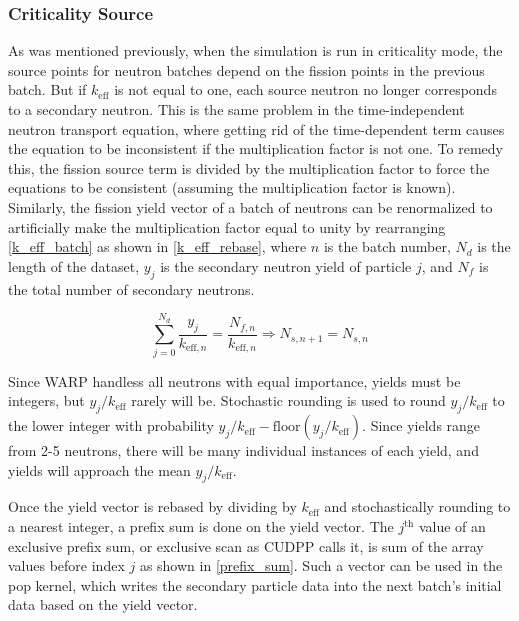 
\subsubsection{Criticality Source}


As was mentioned previously, when the simulation is run in criticality mode, the source points for neutron batches depend on the fission points in the previous batch.  But if $k_\mathrm{eff}$ is not equal to one, each source neutron no longer corresponds to a secondary neutron.  This is the same problem in the time-independent neutron transport equation, where getting rid of the time-dependent term causes the equation to be inconsistent if the multiplication factor is not one.  To remedy this, the fission source term is divided by the multiplication factor to force the equations to be consistent (assuming the multiplication factor is known).  Similarly, the fission yield vector of a batch of neutrons can be renormalized to artificially make the multiplication factor equal to unity by rearranging \eqref{k_eff_batch} as shown in \eqref{k_eff_rebase}, where $n$ is the batch number, $N_d$ is the length of the dataset, $y_j$ is the secondary neutron yield of particle $j$, and $N_f$ is the total number of secondary neutrons.%

\begin{equation}
\label{k_eff_rebase}
\sum_{j=0}^{N_d}  \frac{y_j }{k_{\mathrm{eff},n}} = \frac{N_{f,n}}{k_{\mathrm{eff},n}} \Rightarrow N_{s,n+1} = N_{s,n}
\end{equation}

Since WARP handless all neutrons with equal importance, yields must be integers, but $y_j/k_\mathrm{eff}$ rarely will be.  Stochastic rounding is used to round $y_j/k_\mathrm{eff}$ to the lower integer with probability $y_j/k_\mathrm{eff} - \mathrm{floor}(y_j/k_\mathrm{eff})$.  Since yields range from 2-5 neutrons, there will be many individual instances of each yield, and yields will approach the mean $y_j/k_\mathrm{eff}$.

Once the yield vector is rebased by dividing by $k_\mathrm{eff}$ and stochastically rounding to a nearest integer, a prefix sum is done on the yield vector.  The $j^{\text{th}}$ value of an exclusive prefix sum, or exclusive scan as CUDPP calls it, is sum of the array values before index $j$ as shown in \eqref{prefix_sum}.  Such a vector can be used in the pop kernel, which writes the secondary particle data into the next batch's initial data based on the yield vector.

